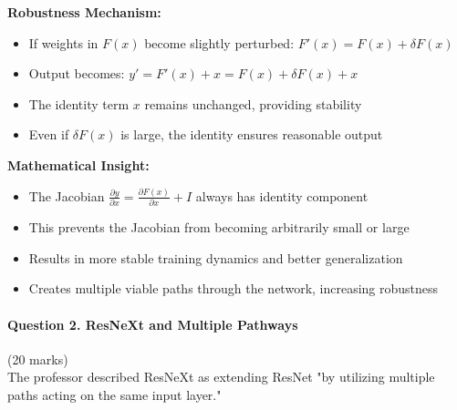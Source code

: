 \documentclass[12pt]{article}
\begin{document}
\begin{enumerate}[(a)]
{    \textbf{Robustness Mechanism:}
    \begin{itemize}
        \item If weights in $F(x)$ become slightly perturbed: $F'(x) = F(x) + \delta F(x)$
        \item Output becomes: $y' = F'(x) + x = F(x) + \delta F(x) + x$
        \item The identity term $x$ remains unchanged, providing stability
        \item Even if $\delta F(x)$ is large, the identity ensures reasonable output
    \end{itemize}
    
    \textbf{Mathematical Insight:}
    \begin{itemize}
        \item The Jacobian $\frac{\partial y}{\partial x} = \frac{\partial F(x)}{\partial x} + I$ always has identity component
        \item This prevents the Jacobian from becoming arbitrarily small or large
        \item Results in more stable training dynamics and better generalization
        \item Creates multiple viable paths through the network, increasing robustness
    \end{itemize}
    }
\end{enumerate}

\newpage
\paragraph{Question 2. ResNeXt and Multiple Pathways}{\hfill (20 marks)}\\
The professor described ResNeXt as extending ResNet "by utilizing multiple paths acting on the same input layer."
\end{document}
